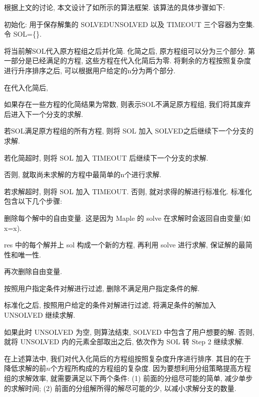 根据上文的讨论, 本文设计了如所示的算法框架. 该算法的具体步骤如下:
\begin{compactenum}[Step 1.]
\item 初始化: 用于保存解集的 SOLVED\D UNSOLVED 以及 TIMEOUT 三个容器为空集. 令 SOL=\{\}. 
\item 将当前解SOL代入原方程组之后并化简. 化简之后, 原方程组可以分为三个部分. 第一部分是已经满足的方程, 这些方程在代入化简后为零. 将剩余的方程按照复杂度进行升序排序之后, 可以根据用户给定的n分为两个部分. 
\item 在代入化简后, 
    \begin{compactenum}[(a)]
    \item 如果存在一些方程的化简结果为常数, 则表示SOL不满足原方程组, 我们将其废弃后进入下一个分支的求解. 
    \item 若SOL满足原方程组的所有方程, 则将 SOL 加入 SOLVED之后继续下一个分支的求解. 
    \item 若化简超时, 则将 SOL 加入 TIMEOUT 后继续下一个分支的求解. 
    \item 否则, 就取尚未求解的方程中最简单的n个进行求解.
    \end{compactenum}
\item 若求解超时, 则将 SOL 加入 TIMEOUT. 否则, 就对求得的解进行标准化. 标准化包含以下几个步骤:
    \begin{compactenum}[(1)]
    \item 删除每个解中的自由变量. 这是因为 Maple 的 solve 在求解时会返回自由变量(如 x=x).
    \item res 中的每个解并上 sol 构成一个新的方程, 再利用 solve 进行求解, 保证解的最简性和唯一性. 
    \item 再次删除自由变量.
    \item 按照用户指定条件对解进行过滤, 删除不满足用户指定条件的解. 
    \end{compactenum}
\item 标准化之后, 按照用户给定的条件对解进行过滤, 将满足条件的解加入 UNSOLVED 继续求解. 
\item 如果此时 UNSOLVED 为空, 则算法结束, SOLVED 中包含了用户想要的解. 否则, 就将 UNSOLVED 内的元素全部取出之后, 依次作为 SOL 转 Step 2 继续求解. 
\end{compactenum}


在上述算法中, 我们对代入化简后的方程组按照复杂度升序进行排序. 其目的在于降低求解的前$n$个方程所构成的方程组的复杂度.  因为要想利用分组策略提高方程组的求解效率, 就需要满足以下两个条件: (1) 前面的分组尽可能的简单, 减少单步的求解时间; (2) 前面的分组解所得的解尽可能的少, 以减小求解分支的数量. 

